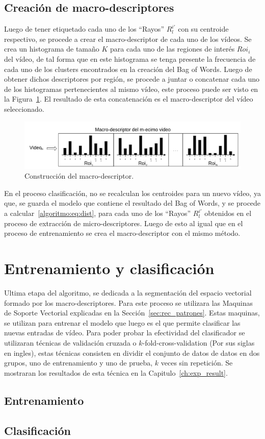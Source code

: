 	\subsection{Creación de macro-descriptores}
	\label{algoritmo:crea_macro-descriptores}
	Luego de tener etiquetado cada uno de los ``Rayos'' $R^{i'}_l$ con su centroide respectivo, se procede a crear el macro-descriptor de cada uno de los vídeos.	 Se crea un histograma de tamaño $K$ para cada uno de las regiones de interés $Roi_i$ del vídeo, de tal forma que en este histograma se tenga presente la frecuencia de cada uno de los clusters encontrados en la creación del Bag of Words. Luego de obtener dichos descriptores por región, se procede a juntar o concatenar cada uno de los histogramas pertenecientes al mismo vídeo, este proceso puede ser visto en la Figura~\ref{algoritmo:fig:macro-descriptores}. El resultado de esta concatenación es el macro-descriptor del vídeo seleccionado.
	\begin{figure}[h]
		\centering
  		\label{algoritmo:fig:macro-descriptores}
    		\includegraphics[width=1\textwidth]{Figuras/Diagramas/macro-descriptor.png}
  		\caption{Construcción del macro-descriptor.}
	\end{figure}	

	En el proceso clasificación, no se recalculan los centroides para un nuevo vídeo, ya que, se guarda el modelo que contiene el resultado del Bag of Words, y se procede a calcular~\ref{algoritmo:eq:dist}, para cada uno de los ``Rayos'' $R^{i'}_l$ obtenidos en el proceso de extracción de micro-descriptores. Luego de esto al igual que en el proceso de entrenamiento se crea el macro-descriptor con el mismo método.
	
	
\section{Entrenamiento y clasificación}
\label{sec:clasificacion}
Ultima etapa del algoritmo, se dedicada a la segmentación del espacio vectorial formado por los macro-descriptores. Para este proceso se utilizara las Maquinas de Soporte Vectorial explicadas en la Sección~\ref{sec:rec_patrones}. Estas maquinas, se utilizan para entrenar el modelo que luego es el que permite clasificar las nuevas entradas de vídeo. 
Para poder probar la efectividad del clasificador se utilizaran técnicas de validación cruzada o $k$-fold-cross-validation (Por sus siglas en ingles), estas técnicas consisten en dividir el conjunto de datos de datos en dos grupos, uno de entrenamiento y uno de prueba, $k$ veces sin repetición. Se mostraran los resultados de esta técnica en la Capitulo~\ref{ch:exp_result}.


	\subsection{Entrenamiento}
	\label{algoritmo:entrenamiento}
	
	\subsection{Clasificación}
	\label{algoritmo:clasificacion}
	
	
	
	
	
	
	